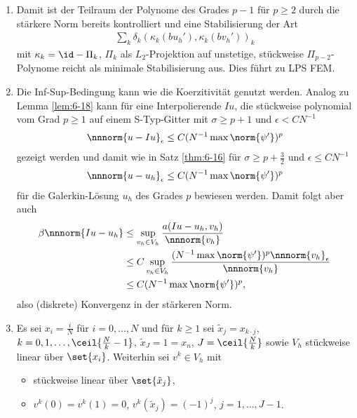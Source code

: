 \begin{bemerkung*}
  \begin{enumerate}
  \item Damit ist der Teilraum der Polynome des Grades $p-1$ für $p \geq 2$ durch die stärkere Norm bereits kontrolliert und eine Stabilisierung der Art
    \begin{align*}
      \sum_{k} \delta_{k} (\kappa_{k}(b u_{h}'), \kappa_{k}(b v_{h}'))_{k}
    \end{align*}
    mit $\kappa_{k} = \id - \Pi_{k}$, $\Pi_{k}$ als $L_{2}$-Projektion auf unstetige, stückweise $\Pi_{p-2}$-Polynome reicht als minimale Stabilisierung aus. Dies führt zu LPS FEM. 
  \item Die Inf-Sup-Bedingung kann wie die Koerzitivität genutzt werden. Analog zu Lemma \ref{lem:6-18} kann für eine Interpolierende $Iu$, die stückweise polynomial vom Grad $p \geq 1$ auf einem S-Typ-Gitter mit $\sigma \geq p + 1$ und $\epsilon < C N^{-1}$
    \begin{align*}
      \nnnorm{u - Iu}_{\epsilon} \leq C (N^{-1} \max \norm{\psi'})^{p}
    \end{align*}
    gezeigt werden und damit wie in Satz \ref{thm:6-16} für $\sigma \geq p+ \frac 32 $ und $\epsilon \leq C N^{-1}$
    \begin{align*}
      \nnnorm{u - u_{h}}_{\epsilon} \leq C (N^{-1} \max \norm{\psi'})^{p}
    \end{align*}
    für die Galerkin-Lösung $u_{h}$ des Grades $p$ bewiesen werden. 
    Damit folgt aber auch
    \begin{align*}
      \beta \nnnorm{Iu - u_{h}} &\leq  \sup_{v_{h} \in V_{h}} \frac{a(Iu - u_{h}, v_{h})} {\nnnorm {v_{h}}}\\
      & \leq C \sup_{v_{h} \in V_{h}} \frac{(N^{-1} \max \norm{\psi'})^{p} \nnnorm{v_{h}}_{\epsilon}} {\nnnorm {v_{h}}}\\
      & \leq C (N^{-1} \max \norm{\psi'})^{p}, 
    \end{align*}
    also (diskrete) Konvergenz in der stärkeren Norm. 
  \item Es sei $x_{i} = \frac i N$ für $i = 0, \dots, N$ und für $k \geq 1$ sei $\tilde x_{j} = x_{k \cdot j}$, $k = 0, 1, \dots, \ceil{\frac Nk - 1}$, $\tilde x_{J} = 1 = x_{n}$, $J = \ceil{\frac N k}$ sowie $V_{h}$ stückweise linear über $\set{x_{i}}$. Weiterhin sei $v^{k} \in V_{h}$ mit
    \begin{itemize}
    \item stückweise linear über $\set{\tilde x_{j}}$, \\
    \item $v^{k}(0) = v^{k}(1) = 0$, $v^{k}(\tilde x_{j}) = (-1)^{j}$, $j = 1, \dots, J-1$. 
    \end{itemize}
    \begin{figure}[ht!]
      \centering
\end{figure}
\end{enumerate}
\end{bemerkung*}
